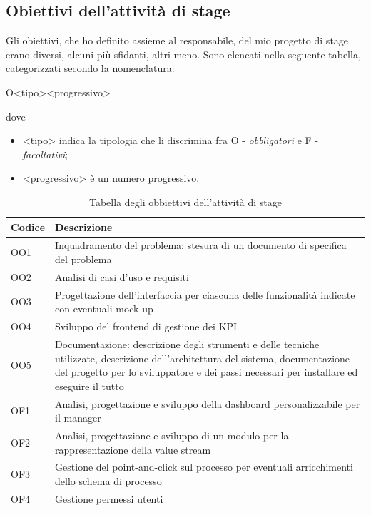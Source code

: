 \subsection{Obiettivi dell'attività di stage}
Gli obiettivi, che ho definito assieme al responsabile, del mio progetto di stage erano diversi, alcuni più sfidanti, altri meno.
Sono elencati nella seguente tabella, categorizzati secondo la nomenclatura:
\begin{center}
    O<tipo><progressivo>
\end{center}
dove
\begin{itemize}
    \item <tipo> indica la tipologia che li discrimina fra O - \textit{obbligatori} e F - \textit{facoltativi};
    \item <progressivo> è un numero progressivo.
\end{itemize}
\begin{table}[H]
    \centering
    \begin{tabular}{|m{}|m{}|}
        \hline
        \textbf{Codice} & \textbf{Descrizione} \\ \hline
        OO1 & Inquadramento del problema: stesura di un documento di specifica del problema \\ \hline
        OO2 & Analisi di casi d’uso e requisiti\\ \hline
        OO3 & Progettazione dell’interfaccia per ciascuna delle funzionalità indicate con eventuali mock-up \\ \hline
        OO4 & Sviluppo del frontend di gestione dei KPI \\ \hline
        OO5 & Documentazione: descrizione degli strumenti e delle tecniche utilizzate, descrizione dell’architettura del sistema, documentazione del progetto per lo sviluppatore e dei passi necessari per installare ed eseguire il tutto \\ \hline
        OF1 & Analisi, progettazione e sviluppo della dashboard personalizzabile per il manager \\ \hline
        OF2 & Analisi, progettazione e sviluppo di un modulo per la rappresentazione della value stream \\ \hline
        OF3 & Gestione del point-and-click sul processo per eventuali arricchimenti dello schema di processo \\ \hline
        OF4 & Gestione permessi utenti \\ \hline
    \end{tabular}
    \caption{Tabella degli obbiettivi dell'attività di stage}
    \label{tab:obiettivi}
\end{table}

